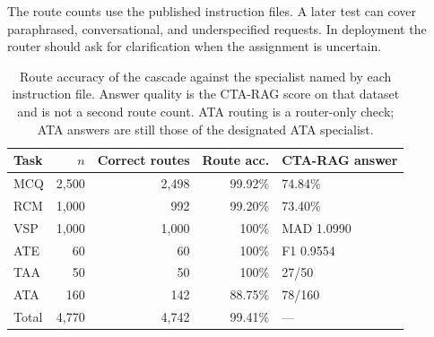\documentclass[5p,times,authoryear]{elsarticle}
\begin{document}
The route counts use the published instruction files. A later test can cover paraphrased, conversational, and underspecified requests. In deployment the router should ask for clarification when the assignment is uncertain.

\begin{table}[t]
\centering
\caption{Route accuracy of the cascade against the specialist named by each instruction file. Answer quality is the CTA-RAG score on that dataset and is not a second route count. ATA routing is a router-only check; ATA answers are still those of the designated ATA specialist.}
\label{tab:route-accuracy}
\small
\begin{tabular}{@{}lrrrl@{}}
\toprule
Task & $n$ & Correct routes & Route acc. & CTA-RAG answer \\
\midrule
MCQ & 2{,}500 & 2{,}498 & 99.92\% & 74.84\% \\
RCM & 1{,}000 & 992 & 99.20\% & 73.40\% \\
VSP & 1{,}000 & 1{,}000 & 100\% & MAD 1.0990 \\
ATE & 60 & 60 & 100\% & F1 0.9554 \\
TAA & 50 & 50 & 100\% & 27/50 \\
ATA & 160 & 142 & 88.75\% & 78/160 \\
\midrule
Total & 4{,}770 & 4{,}742 & 99.41\% & --- \\
\bottomrule
\end{tabular}
\end{table}
\end{document}
